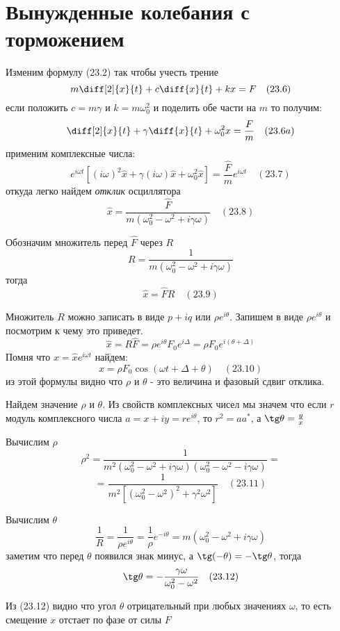 \documentclass[12pt]{article}
\begin{document}
\newpage

\section{Вынужденные колебания с торможением}

Изменим формулу (23.2) так чтобы учесть трение
\[
    m \diff[2]{x}{t} + c \diff{x}{t} + kx = F \quad (23.6)
\]
если положить $c=m\gamma$ и $k=m\omega_0^2$ и поделить обе части на $m$ то получим:
\[
    \diff[2]{x}{t} + \gamma \diff{x}{t} + \omega_0^2 x = \frac{F}{m} \quad (23.6a)
\]
применим комплексные числа:
\[
    e^{i\omega t}[(i\omega)^2 \hat{x} + \gamma(i\omega)\hat{x} + \omega_0^2 \hat{x}] = \frac{\hat
    F}{m} e^{i\omega t} \quad (23.7)
\]
откуда легко найдем \textit{отклик} осциллятора
\[
    \hat{x}=\frac{\hat{F}}{m(\omega_0^2-\omega^2+i\gamma\omega)} \quad (23.8)    
\]

Обозначим множитель перед \(\hat{F}\) через \(R\)
\[
    R=\frac{1}{m(\omega_0^2-\omega^2+i\gamma\omega)}
\]
тогда
\[
    \hat{x}=\hat{F}R \quad (23.9) 
\]

\medbreak

Множитель \(R\) можно записать в виде \(p+iq\) или \(\rho e^{i \theta}\). Запишем в виде \(\rho e^{i \theta}\) и посмотрим к чему это приведет.
\[
    \hat{x}=R\hat{F}=\rho e^{i\theta} F_0e^{i \Delta}=\rho F_0e^{i (\theta+\Delta)}
\]
Помня что \(x=\hat{x}e^{i \omega t}\) найдем:
\[
    x=\rho F_0 \cos(\omega t + \Delta + \theta) \quad (23.10)
\]
из этой формулы видно что \(\rho\) и \(\theta\) - это величина и фазовый сдвиг отклика.

\medbreak

Найдем значение \(\rho\) и \(\theta\). Из свойств комплексных чисел мы значем что если \(r\) модуль комплексного числа \(a=x+iy=r e^{i \theta}\), то \(r^2=aa^*\), а \(\tg \theta = \frac{y}{x} \)

Вычислим \(\rho\)
\[
    \rho^2 = \frac{1}{m^2(\omega_0^2-\omega^2+i\gamma\omega)(\omega_0^2-\omega^2-i\gamma\omega)} =
\]
\[
    = \frac{1}{m^2[(\omega_0^2-\omega^2)^2+\gamma^2\omega^2]} \quad (23.11)
\]

Вычислим \(\theta\)
\[
    \frac{1}{R} = \frac{1}{\rho e^{i \theta}} = \frac{1}{\rho}e^{- i \theta} = m(\omega_0^2-\omega^2+i\gamma\omega)
\]
заметим что перед \(\theta\) появился знак минус, а \( \tg (-\theta)=-\tg \theta \), тогда
\[
    \tg \theta = -\frac{\gamma\omega}{\omega_0^2-\omega^2} \quad (23.12)
\]

Из (23.12) видно что угол  \(\theta\) отрицательный при любых значениях \(\omega\), то есть смещение \(x\) отстает по фазе от силы \(F\)
\end{document}

